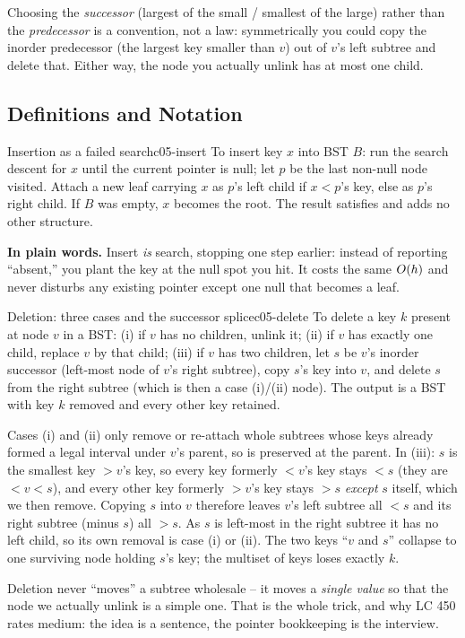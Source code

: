 Choosing the \emph{successor} (largest of the small / smallest of the large) rather than the
\emph{predecessor} is a convention, not a law: symmetrically you could copy the inorder predecessor
(the largest key smaller than $v$) out of $v$'s left subtree and delete that. Either way, the node
you actually unlink has at most one child.

\subsection{Definitions and Notation}

\begin{definition}{Insertion as a failed search}{c05-insert}
To insert key $x$ into BST $B$: run the search descent for $x$ until the current pointer is null;
let $p$ be the last non-null node visited. Attach a new leaf carrying $x$ as $p$'s left child if
$x<p$'s key, else as $p$'s right child. If $B$ was empty, $x$ becomes the root. The result satisfies
 and adds no other structure.
\end{definition}

\noindent\textbf{In plain words.} Insert \emph{is} search, stopping one step earlier: instead of
reporting ``absent,'' you plant the key at the null spot you hit. It costs the same $O(h)$ and
never disturbs any existing pointer except one null that becomes a leaf.

\begin{theorem}{Deletion: three cases and the successor splice}{c05-delete}
To delete a key $k$ present at node $v$ in a BST: (i) if $v$ has no children, unlink it; (ii) if $v$
has exactly one child, replace $v$ by that child; (iii) if $v$ has two children, let $s$ be $v$'s
inorder successor (left-most node of $v$'s right subtree), copy $s$'s key into $v$, and delete $s$
from the right subtree (which is then a case (i)/(ii) node). The output is a BST with key $k$ removed
and every other key retained.
\end{theorem}
\begin{proofbox}
Cases (i) and (ii) only remove or re-attach whole subtrees whose keys already formed a legal interval
under $v$'s parent, so  is preserved at the parent. In (iii): $s$ is the smallest
key $>v$'s key, so every key formerly $<v$'s key stays $<s$ (they are $<v<s$), and every other key
formerly $>v$'s key stays $>s$ \emph{except} $s$ itself, which we then remove. Copying $s$ into $v$
therefore leaves $v$'s left subtree all $<s$ and its right subtree (minus $s$) all $>s$. As $s$ is
left-most in the right subtree it has no left child, so its own removal is case (i) or (ii). The two
keys ``$v$ and $s$'' collapse to one surviving node holding $s$'s key; the multiset of keys loses
exactly $k$. \end{proofbox}
\begin{insightbox}
Deletion never ``moves'' a subtree wholesale -- it moves a \emph{single value} so that the node we
actually unlink is a simple one. That is the whole trick, and why LC 450 rates medium: the idea is a
sentence, the pointer bookkeeping is the interview.
\end{insightbox}

